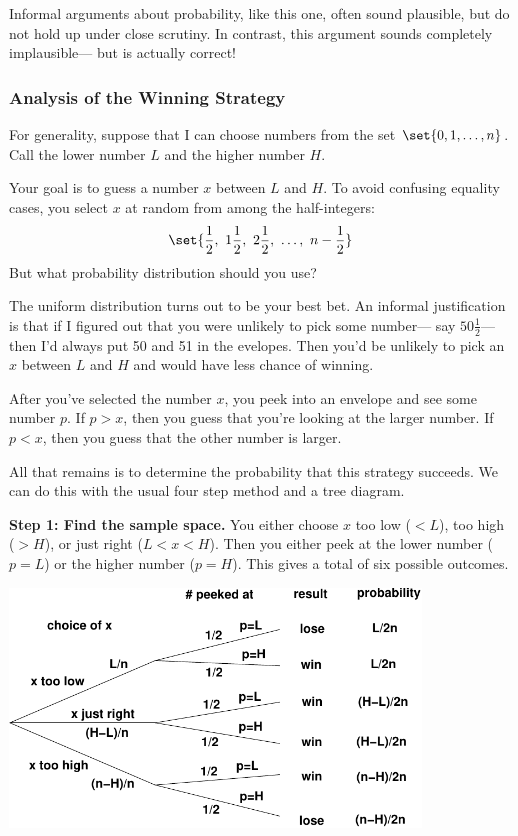 Informal arguments about probability, like this one, often sound
plausible, but do not hold up under close scrutiny.  In contrast, this
argument sounds completely implausible--- but is actually correct!

\subsubsection{Analysis of the Winning Strategy}

For generality, suppose that I can choose numbers from the set
$\set{0, 1, \dots, n}$.  Call the lower number $L$ and the higher
number $H$.

Your goal is to guess a number $x$ between $L$ and $H$.  To avoid
confusing equality cases, you select $x$ at random from among the
half-integers:
%
\[
\set{\frac{1}{2},\ 1\frac{1}{2},\ 2\frac{1}{2},\ \dots,\ n - \frac{1}{2}}
\]
%
But what probability distribution should you use?

The uniform distribution turns out to be your best bet.  An informal
justification is that if I figured out that you were unlikely to pick
some number--- say $50\frac{1}{2}$--- then I'd always put 50 and 51 in
the evelopes.  Then you'd be unlikely to pick an $x$ between $L$ and
$H$ and would have less chance of winning.

After you've selected the number $x$, you peek into an envelope and
see some number $p$.  If $p > x$, then you guess that you're looking
at the larger number.  If $p < x$, then you guess that the other
number is larger.

All that remains is to determine the probability that this strategy
succeeds.  We can do this with the usual four step method and a tree
diagram.

\noindent \textbf{Step 1: Find the sample space. }  You either choose
$x$ too low ($< L$), too high ($> H$), or just right ($L < x < H$).
Then you either peek at the lower number ($p = L$) or the higher
number ($p = H$).  This gives a total of six possible outcomes.
%
\begin{center}
\includegraphics[height=2.5in]{figures/numbers-game}
\end{center}

